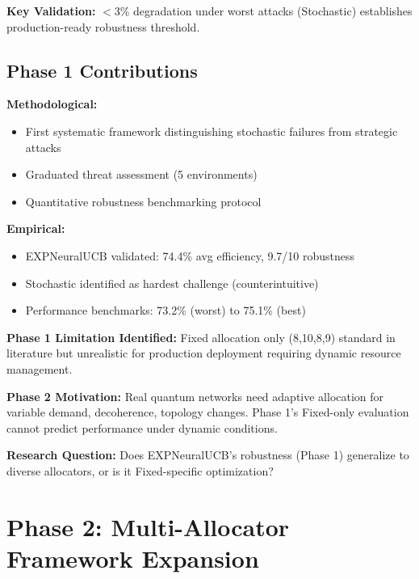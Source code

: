 \documentclass[11pt,a4paper]{article}
\begin{document}
\textbf{Key Validation:} $<$3\% degradation under worst attacks (Stochastic) establishes production-ready robustness threshold.

\subsection{Phase 1 Contributions}

\textbf{Methodological:}
\begin{itemize}
\item First systematic framework distinguishing stochastic failures from strategic attacks
\item Graduated threat assessment (5 environments)
\item Quantitative robustness benchmarking protocol
\end{itemize}

\textbf{Empirical:}
\begin{itemize}
\item EXPNeuralUCB validated: 74.4\% avg efficiency, 9.7/10 robustness
\item Stochastic identified as hardest challenge (counterintuitive)
\item Performance benchmarks: 73.2\% (worst) to 75.1\% (best)
\end{itemize}

\begin{tcolorbox}[colback=stochasticcolor!10,colframe=stochasticcolor,title=\textbf{Phase 1 → Phase 2 Transition}]
\textbf{Phase 1 Limitation Identified:} Fixed allocation only (8,10,8,9) standard in literature but unrealistic for production deployment requiring dynamic resource management.

\textbf{Phase 2 Motivation:} Real quantum networks need adaptive allocation for variable demand, decoherence, topology changes. Phase 1's Fixed-only evaluation cannot predict performance under dynamic conditions.

\textbf{Research Question:} Does EXPNeuralUCB's robustness (Phase 1) generalize to diverse allocators, or is it Fixed-specific optimization?
\end{tcolorbox}


\section{Phase 2: Multi-Allocator Framework Expansion}
\end{document}
